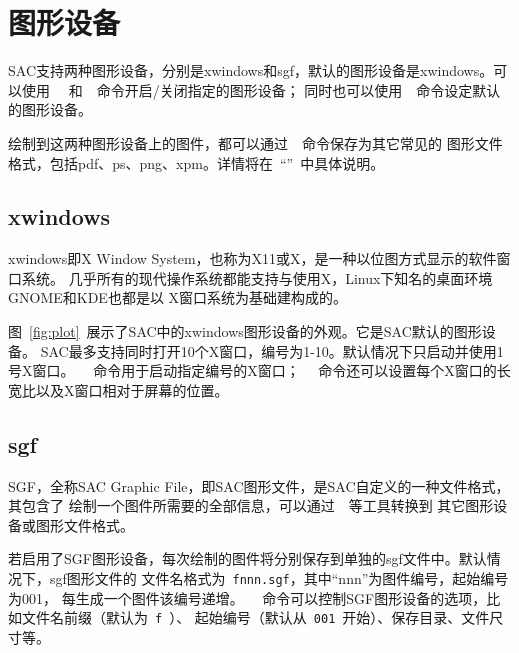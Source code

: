 \section{图形设备}
SAC支持两种图形设备，分别是xwindows和sgf，默认的图形设备是xwindows。可以使用
~~和~~命令开启/关闭指定的图形设备；
同时也可以使用~~命令设定默认的图形设备。

绘制到这两种图形设备上的图件，都可以通过~~命令保存为其它常见的
图形文件格式，包括pdf、ps、png、xpm。详情将在~``''~中具体说明。

\subsection{xwindows}
xwindows即X Window System，也称为X11或X，是一种以位图方式显示的软件窗口系统。
几乎所有的现代操作系统都能支持与使用X，Linux下知名的桌面环境GNOME和KDE也都是以
X窗口系统为基础建构成的。

图~\ref{fig:plot}~展示了SAC中的xwindows图形设备的外观。它是SAC默认的图形设备。
SAC最多支持同时打开10个X窗口，编号为1-10。默认情况下只启动并使用1号X窗口。
~~命令用于启动指定编号的X窗口；
~~命令还可以设置每个X窗口的长宽比以及X窗口相对于屏幕的位置。

\subsection{sgf}
SGF，全称SAC Graphic File，即SAC图形文件，是SAC自定义的一种文件格式，其包含了
绘制一个图件所需要的全部信息，可以通过~~等工具转换到
其它图形设备或图形文件格式。

若启用了SGF图形设备，每次绘制的图件将分别保存到单独的sgf文件中。默认情况下，sgf图形文件的
文件名格式为~\lstinline{fnnn.sgf}，其中``nnn''为图件编号，起始编号为001，
每生成一个图件该编号递增。
~~命令可以控制SGF图形设备的选项，比如文件名前缀（默认为~\lstinline{f}~）、
起始编号（默认从~\lstinline{001}~开始）、保存目录、文件尺寸等。
